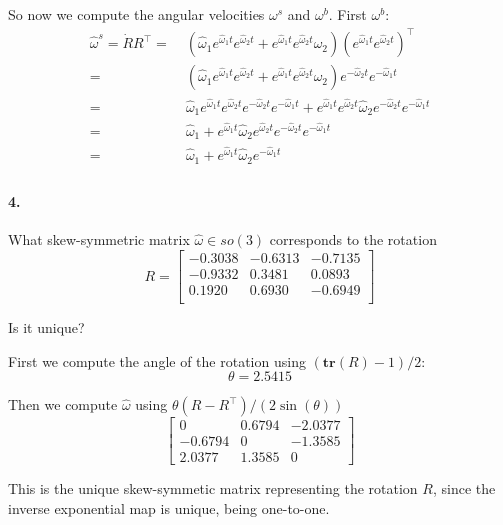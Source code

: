 \documentclass[english]{article}
\begin{document}
So now we compute the angular velocities $\omega^s$ and $\omega^b$. First $\omega^b$:
\begin{align*}
\hat{\omega}^s = \dot{R} R^\top =&\; \left(\hat{\omega}_1 e^{\hat{\omega}_1 t} e^{\hat{\omega}_2 t} + e^{\hat{\omega}_1 t} e^{\hat{\omega}_2 t} \hat{\omega}_2\right) \left( e^{\hat{\omega}_1 t} e^{\hat{\omega}_2 t} \right)^\top  \\
=&\; \left(\hat{\omega}_1 e^{\hat{\omega}_1 t} e^{\hat{\omega}_2 t} + e^{\hat{\omega}_1 t} e^{\hat{\omega}_2 t} \hat{\omega}_2\right) e^{-\hat{\omega}_2 t} e^{-\hat{\omega}_1 t}   \\
=&\; \hat{\omega}_1 e^{\hat{\omega}_1 t} e^{\hat{\omega}_2 t} e^{-\hat{\omega}_2 t} e^{-\hat{\omega}_1 t} + e^{\hat{\omega}_1 t} e^{\hat{\omega}_2 t} \hat{\omega}_2 e^{-\hat{\omega}_2 t} e^{-\hat{\omega}_1 t} \\
=&\; \hat{\omega}_1 + e^{\hat{\omega}_1 t} \hat{\omega}_2 e^{\hat{\omega}_2 t}  e^{-\hat{\omega}_2 t} e^{-\hat{\omega}_1 t} \\
=&\; \hat{\omega}_1 + e^{\hat{\omega}_1 t} \hat{\omega}_2 e^{-\hat{\omega}_1 t} \\
\end{align*}


\paragraph{4.} 
What skew-symmetric matrix $\hat{\omega} \in so(3)$ corresponds to the rotation
\begin{equation*}
R= \begin{bmatrix}
   -0.3038 &  -0.6313 & -0.7135\\
   -0.9332  &  0.3481   & 0.0893\\
    0.1920   & 0.6930 &  -0.6949\\
\end{bmatrix}
\end{equation*}


Is it unique?


First we compute the angle of the rotation using $(\mathbf{tr}(R)-1)/2$:
\[ \theta = 2.5415 \]

Then we compute $\hat{\omega}$ using $\theta (R - R^\top)/(2 \sin(\theta))$
\[ \begin{bmatrix}
         0  &  0.6794 &  -2.0377 \\
   -0.6794  &       0 &  -1.3585 \\
    2.0377  &  1.3585 &        0
  \end{bmatrix}
\]

This is the unique skew-symmetic matrix representing the rotation $R$, since the inverse exponential map is unique, being one-to-one.


%
%
\end{document}
